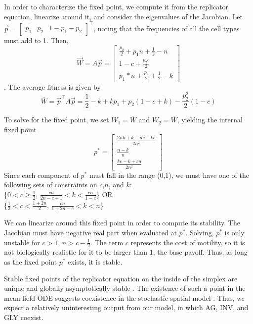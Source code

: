 \documentclass[12pt]{amsart}
\newcommand{\tab}{\hspace*{2em}}
\begin{document}
In order to characterize the fixed point, we compute it from the replicator equation, linearize around it, and consider the eigenvalues of the Jacobian.
Let $\vec{p} = { \begin{bmatrix} p_1 & p_2 & 1-p_1-p_2 \end{bmatrix}}^\top$, noting that the frequencies of all the cell types must add to 1. Then, $$\vec{W} = A\vec{p} = 
{\begin{bmatrix} \frac{p_2}{2} + p_1 n + \frac{1}{2}-n\\
1-c + \frac{p_2 c}{2}\\ %
p_1*n+\frac{p_2}{2} + \frac{1}{2}-k \end{bmatrix}}$$. The average fitness is given by  $$\overline{W} = \vec{p}^\top A \vec{p} = \frac{1}{2}-k+ k p_1 + p_2 (1 - c + k) - \frac{p_2^2}{2} (1-c) $$

To solve for the fixed point, we set $W_1 = \overline{W}$ and $W_2 = \overline{W}$, yielding the internal fixed point 
$$p^* = {\begin{bmatrix}\displaystyle{\frac{2 n k + k - n c - k c}{2n^2}}\\
		\displaystyle{\frac{n-k}{n}}\\
		\displaystyle{\frac{k c - k + c n}{2n^2}}
		\end{bmatrix}}$$
Since each component of $p^*$ must fall in the range (0,1), we must have one of the following sets of constraints on $c$,$n$, and $k$: \\
\{$\displaystyle{0 < c \ge \frac{1}{2}}$, $\displaystyle{\frac{c n}{2 n - c + 1} < k < \frac{c n}{1-c}}$\} \tab OR \\
\{$\displaystyle{\frac{1}{2} < c < \frac{1 + 2n}{2}}$, 
$\displaystyle{\frac{c n}{1 + 2n - c} < k < n}$\}

We can linearize around this fixed point in order to compute its stability. The Jacobian must have negative real part when evaluated at $p^*$. Solving, $p^*$ is only unstable for $c > 1$, $n > c - \frac{1}{2}$. The term $c$ represents the cost of motility, so it is not biologically realistic for it to be larger than 1, the base payoff. Thus, as long as the fixed point $p^*$ exists, it is stable.

Stable fixed points of the replicator equation on the inside of the simplex are unique and globally asymptotically stable \cite{Hofbauer1998}. The existence of such a point in the mean-field ODE suggests coexistence in the stochastic spatial model \cite{Durrett2009}. Thus, we expect a relatively uninteresting output from our model, in which AG, INV, and GLY coexist.
\end{document}
